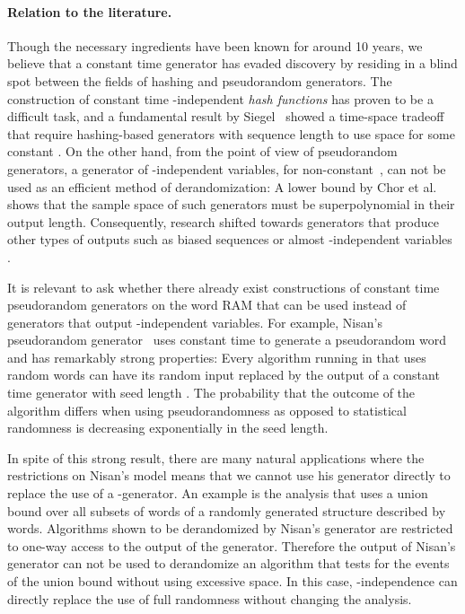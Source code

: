 \documentclass[a4paper,11pt]{article}
\theoremstyle{plain}
\theoremstyle{definition}
\begin{document}
\paragraph{Relation to the literature.}
Though the necessary ingredients have been known for around 10 years, we believe that a constant time generator has evaded discovery by residing in a blind spot between the fields of hashing and pseudorandom generators. 
The construction of constant time -independent \emph{hash functions} has proven to be a difficult task, and a fundamental result by Siegel~\cite{siegel2004} showed a time-space tradeoff that require hashing-based generators with sequence length  to use  space for some constant . 
On the other hand, from the point of view of pseudorandom generators, a generator of -independent variables, for non-constant~, can not be used as an efficient method of derandomization: 
A lower bound by Chor et al.~\cite{chor1985} shows that the sample space of such generators must be superpolynomial in their output length. 
Consequently, research shifted towards generators that produce other types of outputs such as biased sequences or almost -independent variables \cite{alon1992, naor1993, goldreich2010}. 

It is relevant to ask whether there already exist constructions of constant time pseudorandom generators on the word RAM that can be used instead of generators that output -independent variables. 
For example, Nisan's pseudorandom generator~\cite{nisan1992} uses constant time to generate a pseudorandom word and has remarkably strong properties: 
Every algorithm running in  that uses  random words can have its random input replaced by the output of a constant time generator with seed length . 
The probability that the outcome of the algorithm differs when using pseudorandomness as opposed to statistical randomness is decreasing exponentially in the seed length. 

In spite of this strong result, there are many natural applications where the restrictions on Nisan's model means that we cannot use his generator directly to replace the use of a -generator. 
An example is the analysis that uses a union bound over all subsets of  words of a randomly generated structure described by  words.
Algorithms shown to be derandomized by Nisan's generator are restricted to one-way access to the output of the generator. 
Therefore the output of Nisan's generator can not be used to derandomize an algorithm that tests for the events of the union bound without using excessive space.
In this case, \mbox{-independence} can directly replace the use of full randomness without changing the analysis.
\end{document}
